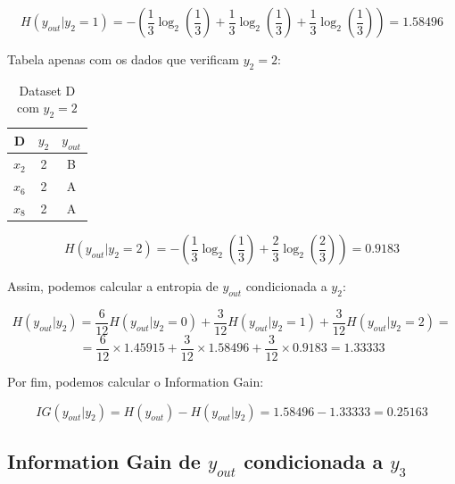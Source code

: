 \documentclass{article}
\begin{document}
\[ H(y_{out}|y_2 = 1) = - \left( \frac{1}{3} \log_2 \left( \frac{1}{3} \right) + \frac{1}{3} \log_2 \left( \frac{1}{3} \right) + \frac{1}{3} \log_2 \left( \frac{1}{3} \right) \right) = 1.58496 \]

Tabela apenas com os dados que verificam $y_2 = 2$:

\begin{table}[h!]
\centering
\begin{tabular}{|c|c|c|}
\hline
    D     & $y_2$ & $y_{out}$ \\ \hline
    $x_2$ & 2     & B         \\ \hline
    $x_6$ & 2     & A         \\ \hline
    $x_8$ & 2     & A         \\ \hline
\end{tabular}
\caption{Dataset D com $y_2 = 2$}
\label{tab:datasetDy2=2}
\end{table}

\[ H(y_{out}|y_2 = 2) = - \left( \frac{1}{3} \log_2 \left( \frac{1}{3} \right) + \frac{2}{3} \log_2 \left( \frac{2}{3} \right) \right) = 0.9183 \]

Assim, podemos calcular a entropia de $y_{out}$ condicionada a $y_2$:

\[ H(y_{out}|y_2) = \frac{6}{12} H(y_{out}|y_2 = 0) + \frac{3}{12} H(y_{out}|y_2 = 1) + \frac{3}{12} H(y_{out}|y_2 = 2) = \]
\[ = \frac{6}{12} \times 1.45915 + \frac{3}{12} \times 1.58496 + \frac{3}{12} \times 0.9183 = 1.33333 \]

Por fim, podemos calcular o Information Gain:

\[ IG(y_{out}|y_2) = H(y_{out}) - H(y_{out}|y_2) = 1.58496 - 1.33333 = 0.25163 \]

\subsection{Information Gain de $y_{out}$ condicionada a $y_3$}
\end{document}
